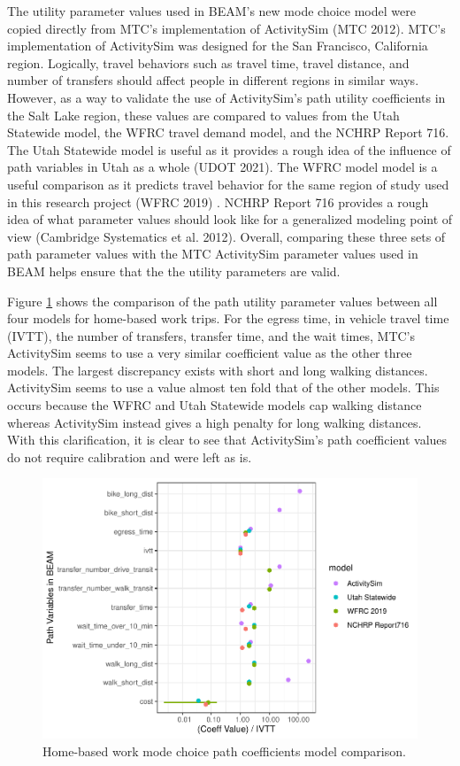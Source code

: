 \documentclass[12pt, oneside, openright]{byuthesis}
\begin{document}
The utility parameter values used in BEAM's new mode choice model were copied directly from MTC's implementation of ActivitySim (MTC 2012). MTC's implementation of ActivitySim was designed for the San Francisco, California region. Logically, travel behaviors such as travel time, travel distance, and number of transfers should affect people in different regions in similar ways. However, as a way to validate the use of ActivitySim's path utility coefficients in the Salt Lake region, these values are compared to values from the Utah Statewide model, the WFRC travel demand model, and the NCHRP Report 716. The Utah Statewide model is useful as it provides a rough idea of the influence of path variables in Utah as a whole (UDOT 2021). The WFRC model model is a useful comparison as it predicts travel behavior for the same region of study used in this research project (WFRC 2019) . NCHRP Report 716 provides a rough idea of what parameter values should look like for a generalized modeling point of view (Cambridge Systematics et al. 2012). Overall, comparing these three sets of path parameter values with the MTC ActivitySim parameter values used in BEAM helps ensure that the the utility parameters are valid.

Figure \ref{fig:hbw} shows the comparison of the path utility parameter values between all four models for home-based work trips. For the egress time, in vehicle travel time (IVTT), the number of transfers, transfer time, and the wait times, MTC's ActivitySim seems to use a very similar coefficient value as the other three models. The largest discrepancy exists with short and long walking distances. ActivitySim seems to use a value almost ten fold that of the other models. This occurs because the WFRC and Utah Statewide models cap walking distance whereas ActivitySim instead gives a high penalty for long walking distances. With this clarification, it is clear to see that ActivitySim's path coefficient values do not require calibration and were left as is.

\begin{figure}

{\centering \includegraphics{thesis_files/figure-latex/hbw-1} 

}

\caption{Home-based work mode choice path coefficients model comparison.}\label{fig:hbw}
\end{figure}
\end{document}
